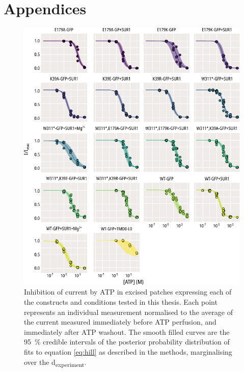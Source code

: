 \chapter{\label{ch:8-appendix}Appendices} 

\graphicspath{{figures/appendix/}}

\begin{figure}[h]
	\centering
	\includegraphics[width=\textwidth]{all_atp_fits.pdf}
	\caption[ATP inhibition population hill fits]{
	{\bf{}}
	Inhibition of current by ATP in excised patches expressing each of the constructs and conditions tested in this thesis.
	Each point represents an individual measurement normalised to the average of the current measured immediately before ATP perfusion, and immediately after ATP washout.
	The smooth filled curves are the \SI{95}{\percent} credible intervals of the posterior probability distribution of fits to equation \ref{eq:hill} as described in the methods, marginalising over the \textgreek{d}\textsubscript{experiment}.
	}
	\label{apxfig:atp_inhib_1}
\end{figure}


